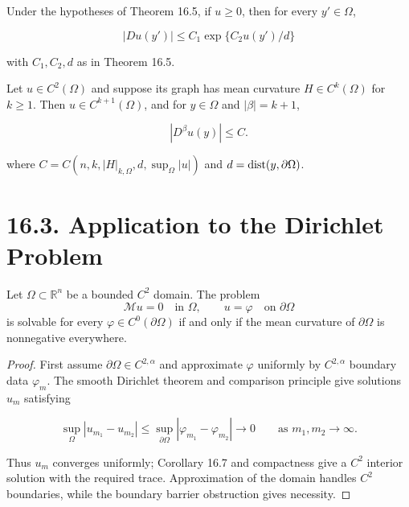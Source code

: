 \begin{corollary}\label{gilbarg-trudinger.cor.16.6.nonnegative-gradient-bound}
Under the hypotheses of Theorem 16.5, if $u\geq0$, then for every $y'\in\Omega$,

\begin{equation}\tag{16.56}
|Du(y')|\le C_1 \exp\{C_2u(y')/d\}
\end{equation}

with $C_1,C_2,d$ as in Theorem 16.5.
\end{corollary}

\begin{corollary}\label{gilbarg-trudinger.cor.16.7.higher-derivative-estimate}
Let $u\in C^2(\Omega)$ and suppose its graph has mean curvature $H\in C^k(\Omega)$ for $k\geq1$. Then $u\in C^{k+1}(\Omega)$, and for $y\in\Omega$ and $|\beta|=k+1$,

\begin{equation}
|D^\beta u(y)|\le C.
\tag{16.57}
\end{equation}

where $C=C(n,k,|H|_{k,\Omega},d,\sup_\Omega|u|)$ and $d=\operatorname{dist}(y,\partial\Omega)$.
\end{corollary}

\section*{16.3. Application to the Dirichlet Problem}

\begin{theorem}\label{gilbarg-trudinger.thm.16.8.minimal-surface-dirichlet}
Let $\Omega\subset\mathbb R^n$ be a bounded $C^2$ domain. The problem
\[
\mathcal Mu=0\quad\text{in }\Omega,\qquad u=\varphi\quad\text{on }\partial\Omega
\]
is solvable for every $\varphi\in C^0(\partial\Omega)$ if and only if the mean curvature of $\partial\Omega$ is nonnegative everywhere.
\end{theorem}
\begin{proof}
\sketch First assume $\partial\Omega\in C^{2,\alpha}$ and approximate $\varphi$ uniformly by $C^{2,\alpha}$ boundary data $\varphi_m$. The smooth Dirichlet theorem and comparison principle give solutions $u_m$ satisfying

\begin{equation*}
\sup_{\Omega} |u_{m_1} - u_{m_2}| \leq \sup_{\partial\Omega} |\varphi_{m_1} - \varphi_{m_2}| \to 0 \qquad \text{as } m_1, m_2 \to \infty.
\end{equation*}

Thus $u_m$ converges uniformly; Corollary 16.7 and compactness give a $C^2$ interior solution with the required trace. Approximation of the domain handles $C^2$ boundaries, while the boundary barrier obstruction gives necessity.
\end{proof}

